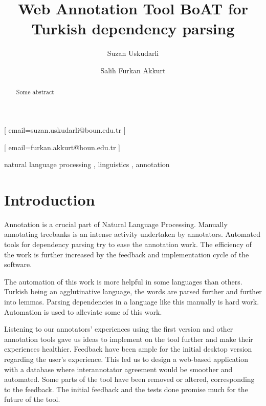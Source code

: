 \documentclass[
]{ceurart}
\begin{document}


\title{Web Annotation Tool BoAT for Turkish dependency parsing}

\author[1]{Suzan Uskudarli}[%
email=suzan.uskudarli@boun.edu.tr
]

\author[1]{Salih Furkan Akkurt}[%
email=furkan.akkurt@boun.edu.tr
]

\address[1]{ Department of Computer Engineering, Bogazici University, Bebek, 34342, İstanbul, Turkey }

\begin{abstract}
Some abstract
\end{abstract}

\begin{keywords}
natural language processing \sep
linguistics \sep
annotation
\end{keywords}

\maketitle

\section{Introduction}

Annotation is a crucial part of Natural Language Processing.
Manually annotating treebanks is an intense activity undertaken by annotators.
Automated tools for dependency parsing try to ease the annotation work.
The efficiency of the work is further increased by the feedback and implementation cycle of the software.

The automation of this work is more helpful in some languages than others.
Turkish being an agglutinative language, the words are parsed further and further into lemmas.
Parsing dependencies in a language like this manually is hard work.
Automation is used to alleviate some of this work.

Listening to our annotators' experiences using the first version and other annotation tools gave us ideas to implement on the tool further and make their experiences healthier.
Feedback have been ample for the initial desktop version regarding the user's experience.
This led us to design a web-based application with a database where interannotator agreement would be smoother and automated.
Some parts of the tool have been removed or altered, corresponding to the feedback.
The initial feedback and the tests done promise much for the future of the tool.
\end{document}
